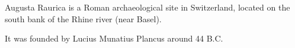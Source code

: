 Augusta Raurica is a Roman archaeological site in Switzerland, located on the south bank of the Rhine river (near Basel).

It was founded by Lucius Munatius Plancus around 44 B.C.
